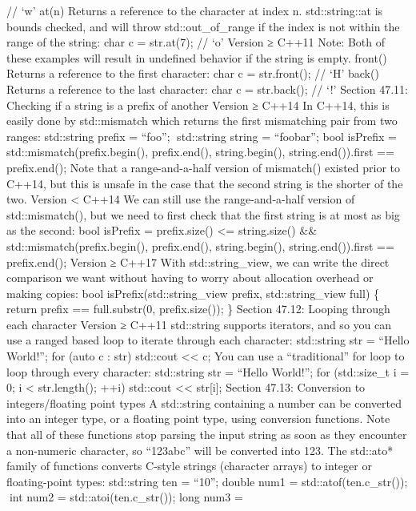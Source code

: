 // `w' at(n) Returns a reference to the character at index n.
std::string::at is bounds checked, and will throw std::out\_of\_range if
the index is not within the range of the string: char c = str.at(7); //
`o' Version ≥ C++11 Note: Both of these examples will result in undeﬁned
behavior if the string is empty. front() Returns a reference to the ﬁrst
character: char c = str.front(); // `H' back() Returns a reference to
the last character: char c = str.back(); // `!' Section 47.11: Checking
if a string is a preﬁx of another Version ≥ C++14 In C++14, this is
easily done by std::mismatch which returns the ﬁrst mismatching pair
from two ranges: std::string prefix = ``foo''; std::string string =
``foobar''; bool isPrefix = std::mismatch(prefix.begin(), prefix.end(),
string.begin(), string.end()).first == prefix.end(); Note that a
range-and-a-half version of mismatch() existed prior to C++14, but this
is unsafe in the case that the second string is the shorter of the two.
Version \textless{} C++14 We can still use the range-and-a-half version
of std::mismatch(), but we need to ﬁrst check that the ﬁrst string is at
most as big as the second: bool isPrefix = prefix.size() \textless=
string.size() \&\& std::mismatch(prefix.begin(), prefix.end(),
string.begin(), string.end()).first == prefix.end(); Version ≥ C++17
With std::string\_view, we can write the direct comparison we want
without having to worry about allocation overhead or making copies: bool
isPrefix(std::string\_view prefix, std::string\_view full) \{ return
prefix == full.substr(0, prefix.size()); \} Section 47.12: Looping
through each character Version ≥ C++11 std::string supports iterators,
and so you can use a ranged based loop to iterate through each
character: std::string str = ``Hello World!''; for (auto c : str)
std::cout \textless\textless{} c; You can use a ``traditional'' for loop
to loop through every character: std::string str = ``Hello World!''; for
(std::size\_t i = 0; i \textless{} str.length(); ++i) std::cout
\textless\textless{} str{[}i{]}; Section 47.13: Conversion to
integers/ﬂoating point types A std::string containing a number can be
converted into an integer type, or a ﬂoating point type, using
conversion functions. Note that all of these functions stop parsing the
input string as soon as they encounter a non-numeric character, so
``123abc'' will be converted into 123. The std::ato* family of functions
converts C-style strings (character arrays) to integer or ﬂoating-point
types: std::string ten = ``10''; double num1 = std::atof(ten.c\_str());
int num2 = std::atoi(ten.c\_str()); long num3 =
